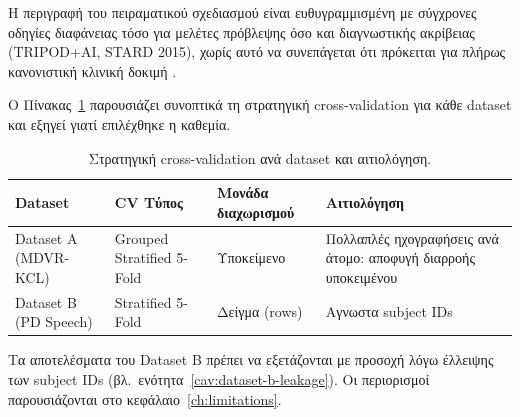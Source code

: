 Η περιγραφή του πειραματικού σχεδιασμού είναι ευθυγραμμισμένη με σύγχρονες οδηγίες διαφάνειας τόσο για μελέτες πρόβλεψης όσο και διαγνωστικής ακρίβειας (TRIPOD+AI, STARD 2015), 
χωρίς αυτό να συνεπάγεται ότι πρόκειται για πλήρως κανονιστική κλινική δοκιμή \citep{collins2024tripod,stard2015}.

Ο Πίνακας~\ref{tab:cv-strategy} παρουσιάζει συνοπτικά τη στρατηγική cross-validation για κάθε dataset και εξηγεί γιατί επιλέχθηκε η καθεμία.

\begin{table}[H]
\centering
\caption{Στρατηγική cross-validation ανά dataset και αιτιολόγηση.}
\label{tab:cv-strategy}
\small
\begin{tabular}{@{}p{2.7cm}p{2.7cm}p{2.4cm}p{4.5cm}@{}}
\toprule
\textbf{Dataset} & \textbf{CV Τύπος} & \textbf{Μονάδα διαχωρισμού} & \textbf{Αιτιολόγηση} \\
\midrule
Dataset A (MDVR-KCL) & Grouped Stratified 5-Fold & Υποκείμενο & Πολλαπλές ηχογραφήσεις ανά άτομο: αποφυγή διαρροής υποκειμένου \\
Dataset B (PD Speech) & Stratified 5-Fold & Δείγμα (rows) & Αγνωστα subject IDs \\
\bottomrule
\end{tabular}
\vspace{2pt}
\end{table}

Τα αποτελέσματα του Dataset B πρέπει να εξετάζονται με προσοχή λόγω έλλειψης των subject IDs  (βλ.\ ενότητα~\ref{cav:dataset-b-leakage}).
Οι περιορισμοί παρουσιάζονται στο κεφάλαιο~\ref{ch:limitations}.